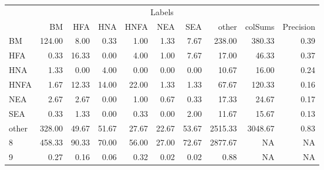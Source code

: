 \begin{table}
\centering\begingroup\fontsize{11}{13}\selectfont

\begin{tabular}{lrrrrrr>{}r|rr}
\toprule
\multicolumn{10}{c}{Labels} \\
\cmidrule(l{3pt}r{3pt}){1-10}
  & BM & HFA & HNA & HNFA & NEA & SEA & other & colSums & Precision\\
\midrule
BM & 124.00 & 8.00 & 0.33 & 1.00 & 1.33 & 7.67 & 238.00 & 380.33 & 0.39\\
HFA & 0.33 & 16.33 & 0.00 & 4.00 & 1.00 & 7.67 & 17.00 & 46.33 & 0.37\\
HNA & 1.33 & 0.00 & 4.00 & 0.00 & 0.00 & 0.00 & 10.67 & 16.00 & 0.24\\
HNFA & 1.67 & 12.33 & 14.00 & 22.00 & 1.33 & 1.33 & 67.67 & 120.33 & 0.16\\
NEA & 2.67 & 2.67 & 0.00 & 1.00 & 0.67 & 0.33 & 17.33 & 24.67 & 0.17\\
\addlinespace
SEA & 0.33 & 1.33 & 0.00 & 0.33 & 0.00 & 2.00 & 11.67 & 15.67 & 0.13\\
other & 328.00 & 49.67 & 51.67 & 27.67 & 22.67 & 53.67 & 2515.33 & 3048.67 & 0.83\\
8 & 458.33 & 90.33 & 70.00 & 56.00 & 27.00 & 72.67 & 2877.67 & NA & NA\\
9 & 0.27 & 0.16 & 0.06 & 0.32 & 0.02 & 0.02 & 0.88 & NA & NA\\
\bottomrule
\end{tabular}
\endgroup{}
\end{table}
